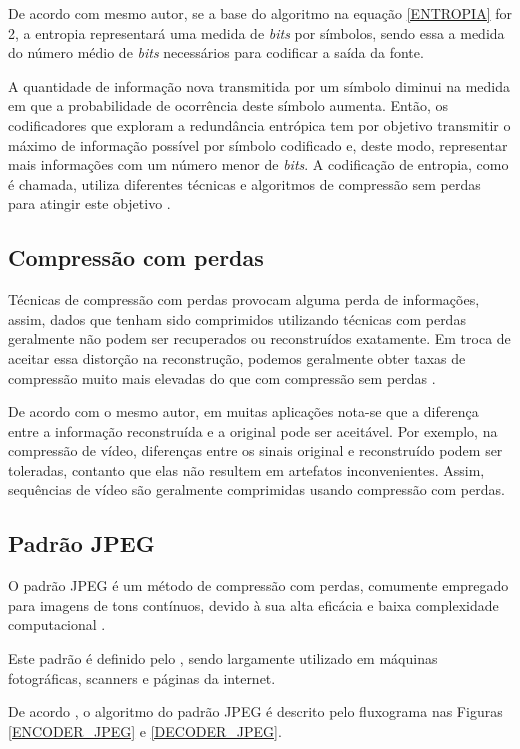 De acordo com mesmo autor, se a base do algoritmo na equação \ref{ENTROPIA} for 2, a entropia representará uma medida de \textit{bits} por símbolos, sendo essa a medida do número médio de \textit{bits} necessários para codificar a saída da fonte. 

A quantidade de informação nova transmitida por um símbolo diminui na medida em que a probabilidade de ocorrência deste símbolo aumenta. Então, os codificadores que exploram a redundância entrópica tem por objetivo transmitir o máximo de informação possível por símbolo codificado e, deste modo, representar
mais informações com um número menor de \textit{bits}. A codificação de entropia, como é chamada, utiliza diferentes técnicas e algoritmos de compressão sem perdas para atingir este objetivo \cite{da2007estudo}.

\subsection{Compressão com perdas}

Técnicas de compressão com perdas provocam alguma perda de informações, assim, dados que tenham sido comprimidos utilizando técnicas com perdas geralmente não podem ser recuperados ou reconstruídos exatamente. Em troca de aceitar essa distorção na reconstrução, podemos geralmente obter taxas de compressão muito mais elevadas do que com compressão sem perdas  \cite{sayood2012introduction}.

De acordo com o mesmo autor, em muitas aplicações nota-se que a diferença entre a informação reconstruída e a original pode ser aceitável. Por exemplo, na compressão de vídeo, diferenças entre os sinais original e reconstruído podem ser toleradas, contanto que elas não resultem em artefatos inconvenientes. Assim, sequências de vídeo são geralmente comprimidas usando compressão com perdas.

\subsection{Padrão JPEG} \label{JPEG}
 O padrão JPEG é um método de compressão com perdas, comumente empregado para imagens de tons contínuos, devido à sua alta eficácia e baixa complexidade computacional \cite{wang2008jpeg}.
 
Este padrão é definido pelo \cite{T.81}, sendo largamente utilizado em máquinas fotográficas, scanners e páginas da internet. 

De acordo \cite{wallace1991jpeg}, o algoritmo do padrão JPEG é descrito pelo fluxograma nas Figuras \ref{ENCODER_JPEG} e \ref{DECODER_JPEG}.

